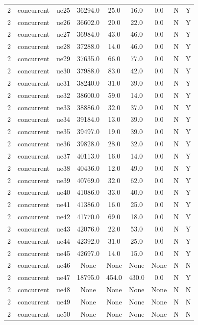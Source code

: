 \begin{table}[ht]
\begin{tabular}{|c|c|c|c|c|c|c|c|c|}
2 & concurrent & ue25 & 36294.0 & 25.0 & 16.0 & 0.0 & N & Y \\
2 & concurrent & ue26 & 36602.0 & 20.0 & 22.0 & 0.0 & N & Y \\
2 & concurrent & ue27 & 36984.0 & 43.0 & 46.0 & 0.0 & N & Y \\
2 & concurrent & ue28 & 37288.0 & 14.0 & 46.0 & 0.0 & N & Y \\
2 & concurrent & ue29 & 37635.0 & 66.0 & 77.0 & 0.0 & N & Y \\
2 & concurrent & ue30 & 37988.0 & 83.0 & 42.0 & 0.0 & N & Y \\
2 & concurrent & ue31 & 38240.0 & 31.0 & 39.0 & 0.0 & N & Y \\
2 & concurrent & ue32 & 38600.0 & 59.0 & 14.0 & 0.0 & N & Y \\
2 & concurrent & ue33 & 38886.0 & 32.0 & 37.0 & 0.0 & N & Y \\
2 & concurrent & ue34 & 39184.0 & 13.0 & 39.0 & 0.0 & N & Y \\
2 & concurrent & ue35 & 39497.0 & 19.0 & 39.0 & 0.0 & N & Y \\
2 & concurrent & ue36 & 39828.0 & 28.0 & 32.0 & 0.0 & N & Y \\
2 & concurrent & ue37 & 40113.0 & 16.0 & 14.0 & 0.0 & N & Y \\
2 & concurrent & ue38 & 40436.0 & 12.0 & 49.0 & 0.0 & N & Y \\
2 & concurrent & ue39 & 40769.0 & 32.0 & 62.0 & 0.0 & N & Y \\
2 & concurrent & ue40 & 41086.0 & 33.0 & 40.0 & 0.0 & N & Y \\
2 & concurrent & ue41 & 41386.0 & 16.0 & 25.0 & 0.0 & N & Y \\
2 & concurrent & ue42 & 41770.0 & 69.0 & 18.0 & 0.0 & N & Y \\
2 & concurrent & ue43 & 42076.0 & 22.0 & 53.0 & 0.0 & N & Y \\
2 & concurrent & ue44 & 42392.0 & 31.0 & 25.0 & 0.0 & N & Y \\
2 & concurrent & ue45 & 42697.0 & 14.0 & 15.0 & 0.0 & N & Y \\
2 & concurrent & ue46 & None & None & None & None & N & N \\
2 & concurrent & ue47 & 18795.0 & 454.0 & 430.0 & 0.0 & N & Y \\
2 & concurrent & ue48 & None & None & None & None & N & N \\
2 & concurrent & ue49 & None & None & None & None & N & N \\
2 & concurrent & ue50 & None & None & None & None & N & N \\

\end{tabular}
\end{table}

